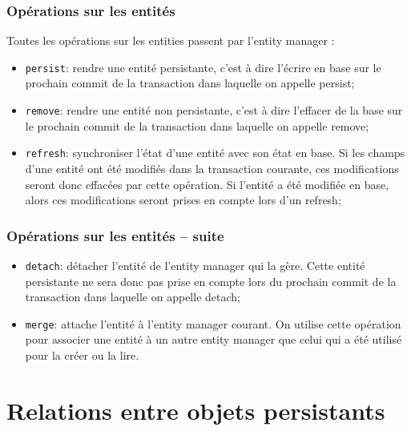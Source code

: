 \documentclass[aspectratio=169,10pt]{beamer}
\begin{document}
\begin{frame}
	\frametitle{Opérations sur les entités}
	Toutes les opérations sur les entities passent par l'entity manager :
	\begin{itemize}
		\item  \texttt{persist}: rendre une entité persistante, c'est à dire l'écrire en base sur le prochain commit de la transaction dans laquelle on appelle persist;
		\item \texttt{remove}: rendre une entité non persistante, c'est à dire l'effacer de la base sur le prochain commit de la transaction dans laquelle on appelle remove;
		\item \texttt{refresh}: synchroniser l'état d'une entité avec son état en base. Si les champs d'une entité ont été modifiés dans la transaction courante, ces modifications seront donc effacées par cette opération. Si l'entité a été modifiée en base, alors ces modifications seront prises en compte lors d'un refresh;
	\end{itemize}

\end{frame}

\begin{frame}
\frametitle{Opérations sur les entités -- suite}	
	\begin{itemize}
		\item \texttt{detach}: détacher l'entité de l'entity manager qui la gère. Cette entité persistante ne sera donc pas prise en compte lors du prochain commit de la transaction dans laquelle on appelle detach;
		\item \texttt{merge}: attache l'entité à l'entity manager courant. On utilise cette opération pour associer une entité à un autre entity manager que celui qui a été utilisé pour la créer ou la lire.
	\end{itemize}	
\end{frame}

\section{Relations entre objets persistants}
\end{document}
